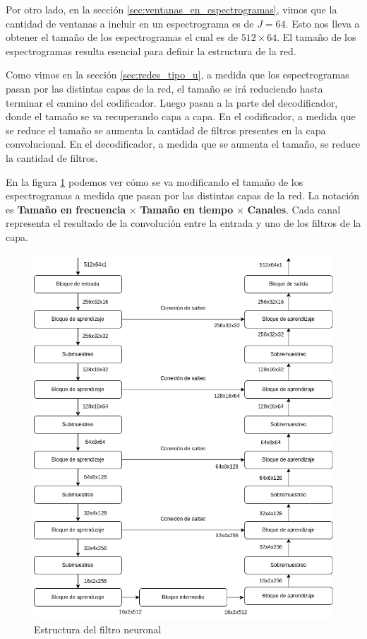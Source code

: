Por otro lado, en la sección \ref{sec:ventanas_en_espectrogramas}, vimos que la cantidad de ventanas a incluir en un espectrograma es de $J=64$. Esto nos lleva a obtener el tamaño de los espectrogramas el cual es de $512 \times 64$. El tamaño de los espectrogramas resulta esencial para definir la estructura de la red.

Como vimos en la sección \ref{sec:redes_tipo_u}, a medida que los espectrogramas pasan por las distintas capas de la red, el tamaño se irá reduciendo hasta terminar el camino del codificador. Luego pasan a la parte del decodificador, donde el tamaño se va recuperando capa a capa. En el codificador, a medida que se reduce el tamaño se aumenta la cantidad de filtros presentes en la capa convolucional. En el decodificador, a medida que se aumenta el tamaño, se reduce la cantidad de filtros.

En la figura \ref{fig:ch7_red_estructura} podemos ver cómo se va modificando el tamaño de los espectrogramas a medida que pasan por las distintas capas de la red. La notación es \textbf{Tamaño en frecuencia} $\times$ \textbf{Tamaño en tiempo} $\times$ \textbf{Canales}. Cada canal representa el resultado de la convolución entre la entrada y uno de los filtros de la capa.

\begin{figure}
	\centering
	\centerline{\includegraphics[scale=0.65]{images/ch7/red_estructura.png}}
	\caption{Estructura del filtro neuronal}
	\label{fig:ch7_red_estructura}
\end{figure}

